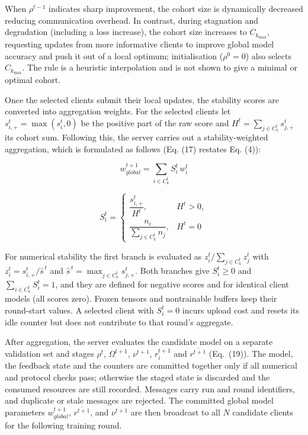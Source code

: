 \documentclass[pdflatex,sn-mathphys-num,oneside]{sn-jnl}%
\theoremstyle{thmstyleone}%
\theoremstyle{thmstyletwo}%
\theoremstyle{thmstylethree}%
\begin{document}
When $\rho^{t-1}$ indicates sharp improvement, the cohort size is dynamically decreased reducing communication overhead. In contrast, during stagnation and degradation (including a loss increase), the cohort size increases to $C_{k_{\max}}$, requesting updates from more informative clients to improve global model accuracy and push it out of a local optimum; initialisation ($\rho^0=0$) also selects $C_{k_{\max}}$. The rule is a heuristic interpolation and is not shown to give a minimal or optimal cohort.

Once the selected clients submit their local updates, the stability scores are converted into aggregation weights. For the selected clients let $s_{i,+}^t=\max(s_i^t,0)$ be the positive part of the raw score and $H^t=\sum_{j\in C_k^t}s_{j,+}^t$ its cohort sum. Following this, the server carries out a stability-weighted aggregation, which is formulated as follows (Eq. (17) restates Eq. (4)):

\begin{equation}
w_{{global}}^{t+1} = \sum_{i \in C_k^t} S_i^t \, w_i^t
\label{eq:stability_weighted_update}
\end{equation}

\begin{equation}
S_i^t =
\begin{cases}
\dfrac{s_{i,+}^t}{H^t}, & H^t>0,\\[1.5ex]
\dfrac{n_i}{\sum_{j\in C_k^t} n_j}, & H^t=0
\end{cases}
\label{eq:stability_norm}
\end{equation}

For numerical stability the first branch is evaluated as $z_i^t/\sum_{j\in C_k^t}z_j^t$ with $z_i^t=s_{i,+}^t/\hat{s}^{\,t}$ and $\hat{s}^{\,t}=\max_{j\in C_k^t}s_{j,+}^t$. Both branches give $S_i^t\ge 0$ and $\sum_{i\in C_k^t}S_i^t=1$, and they are defined for negative scores and for identical client models (all scores zero). Frozen tensors and nontrainable buffers keep their round-start values. A selected client with $S_i^t=0$ incurs upload cost and resets its idle counter but does not contribute to that round's aggregate.

After aggregation, the server evaluates the candidate model on a separate validation set and stages $\rho^t$, $\Omega^{t+1}$, $\nu^{t+1}$, $r_i^{t+1}$ and $\overline{r^{t+1}}$ (Eq.~(19)). The model, the feedback state and the counters are committed together only if all numerical and protocol checks pass; otherwise the staged state is discarded and the consumed resources are still recorded. Messages carry run and round identifiers, and duplicate or stale messages are rejected. The committed global model parameters $w_{{global}}^{t+1}$, $\overline{r^{t+1}}$, and $\nu^{t+1}$ are then broadcast to all $N$ candidate clients for the following training round.
\end{document}

